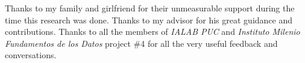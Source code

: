 Thanks to my family and girlfriend for their unmeasurable support during the time
this research was done. Thanks to my advisor for his great guidance and contributions.
Thanks to all the members of \textit{IALAB PUC} and \textit{Instituto Milenio Fundamentos de los Datos}
project \#4 for all the very useful feedback and conversations.




